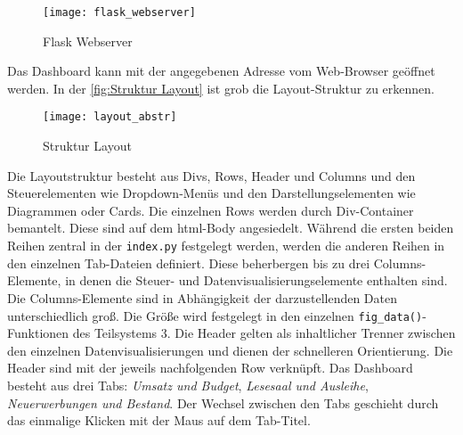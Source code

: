     \begin{figure}[H]
        \centering
            \texttt{[image: flask\_webserver]}
            \caption{Flask Webserver}
            \label{fig:flask}
    \end{figure}

    
    Das Dashboard kann mit der angegebenen Adresse vom Web-Browser geöffnet werden.
    In der \autoref{fig:Struktur Layout} ist grob die Layout-Struktur zu erkennen. 


    \begin{figure}[H]
        \centering
            \texttt{[image: layout\_abstr]}
            \caption{Struktur Layout}
            \label{fig:Struktur Layout}
    \end{figure}


    Die Layoutstruktur besteht aus Divs, Rows, Header und  Columns und den Steuerelementen wie Dropdown-Menüs und den Darstellungselementen wie Diagrammen oder
    Cards. Die einzelnen Rows werden durch Div-Container bemantelt. Diese sind auf dem html-Body angesiedelt.
    Während die ersten beiden Reihen zentral in der \texttt{index.py} festgelegt werden, werden die anderen Reihen in den einzelnen Tab-Dateien definiert. 
    Diese beherbergen bis zu drei Columns-Elemente, in denen die Steuer- und Datenvisualisierungselemente enthalten sind.
    Die Columns-Elemente sind in Abhängigkeit der darzustellenden Daten unterschiedlich groß. 
    Die Größe wird festgelegt in den einzelnen \texttt{fig\_data()}-Funktionen des Teilsystems 3.
    Die Header gelten als inhaltlicher Trenner zwischen den einzelnen Datenvisualisierungen und dienen der schnelleren Orientierung. 
    Die Header sind mit der jeweils nachfolgenden Row verknüpft. Das Dashboard besteht aus drei Tabs: \textit{Umsatz und Budget}, 
    \textit{Lesesaal und Ausleihe}, \textit{Neuerwerbungen und Bestand}. Der Wechsel zwischen den Tabs geschieht durch das einmalige
    Klicken mit der Maus auf dem Tab-Titel.

